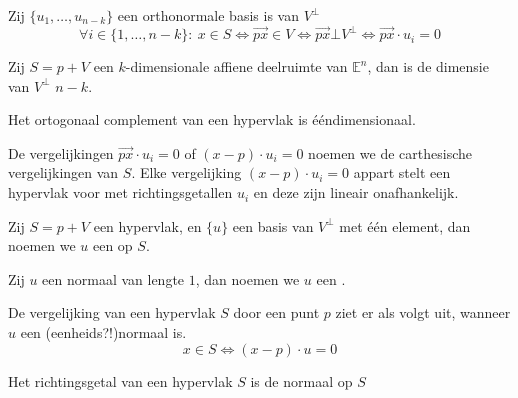 \documentclass[main.tex]{subfiles}
\begin{document}
\begin{st}
  Zij $\{u_{1}, \dotsc, u_{n-k}\}$ een orthonormale basis is van $V^{\bot}$
  \[ \forall i \in \{ 1, \dotsc, n-k \} :\ x \in S \Leftrightarrow \overrightarrow{px} \in V \Leftrightarrow \overrightarrow{px} \bot V^{\bot} \Leftrightarrow \overrightarrow{px} \cdot u_{i} = 0 \]
\end{st}

\begin{st}
  Zij $S=p+V$ een $k$-dimensionale affiene deelruimte van $\mathbb{E}^{n}$, dan is de dimensie van $V^{\bot}$ $n-k$.
\end{st}

\begin{gev}
  Het ortogonaal complement van een hypervlak is \'e\'endimensionaal.
\end{gev}

\begin{de}
  De vergelijkingen $\overrightarrow{px} \cdot u_{i} = 0$ of $(x-p) \cdot u_{i} = 0$ noemen we de carthesische vergelijkingen van $S$. Elke vergelijking $(x-p)\cdot u_{i} = 0$ appart stelt een hypervlak voor met richtingsgetallen $u_{i}$ en deze zijn lineair onafhankelijk.
\end{de}

\begin{de}
  Zij $S=p+V$ een hypervlak, en $\{u\}$ een basis van $V^{\bot}$ met \'e\'en element, dan noemen we $u$ een  op $S$.
\end{de}

\begin{de}
  Zij $u$ een normaal van lengte $1$, dan noemen we $u$ een .
\end{de}

\begin{st}
  De vergelijking van een hypervlak $S$ door een punt $p$ ziet er als volgt uit, wanneer $u$ een (eenheids?!)normaal is.
  \[ x \in S \Leftrightarrow (x-p) \cdot u = 0 \]
\end{st}

\begin{gev}
  Het richtingsgetal van een hypervlak $S$ is de normaal op $S$
\end{gev}
\end{document}
